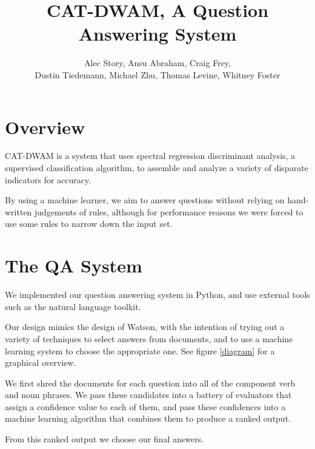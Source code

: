 \documentclass{article}
\title{CAT-DWAM, A Question Answering System}
\author{
Alec Story,
Ansu Abraham,
Craig Frey,\\
Dustin Tiedemann,
Michael Zhu,
Thomas Levine,
Whitney Foster\\
}
\begin{document}
\maketitle

\section{Overview}

CAT-DWAM is a system that uses spectral regression discriminant analysis, a
supervised classification algorithm, to assemble and analyze a variety of
disparate indicators for accuracy.

By using a machine learner, we aim to answer questions without relying on
hand-written judgements of rules, although for performance reasons we were
forced to use some rules to narrow down the input set.


\section{The QA System}

We implemented our question answering system in Python, and use external
tools such as the natural language toolkit.

Our design mimics the design of Watson, with the intention of trying out a
variety of techniques to select answers from documents, and to use a machine
learning system to choose the appropriate one.  See figure \ref{diagram} for
a graphical overview.

We first shred the documents for each question into all of the component verb
and noun phrases.  We pass these candidates into a battery of evaluators that
assign a confidence value to each of them, and pass these confidences into a
machine learning algorithm that combines them to produce a ranked output.

From this ranked output we choose our final answers.
\end{document}
